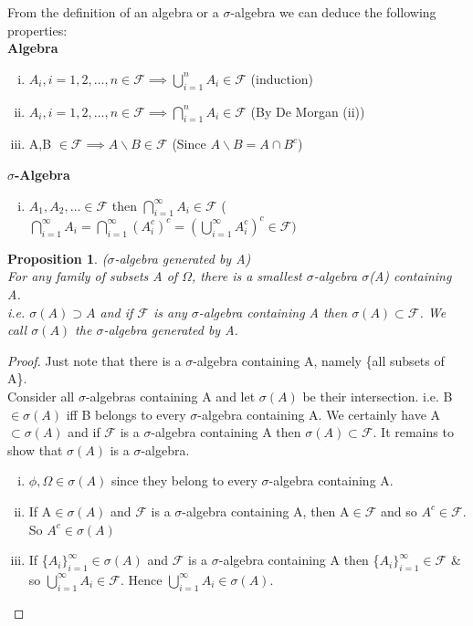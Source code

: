 \documentclass[12pt]{article}
\newtheorem{prop}{Proposition}
\begin{document}
From the definition of an algebra or a $\sigma$-algebra we can deduce the following properties:
\vspace{20pt}\\
{\bf Algebra}
\begin{enumerate}[(i)]
  \item $A_{i}, i=1,2,\dots,n \in \mathcal{F} \implies \bigcup_{i=1}^{n} A_{i} \in \mathcal{F}$ (induction)
  \item  $A_{i}, i=1,2,\dots,n \in \mathcal{F} \implies \bigcap_{i=1}^{n} A_{i} \in \mathcal{F}$ (By De Morgan (ii))
  \item A,B $\in \mathcal{F} \implies A\backslash B\in \mathcal{F}$ (Since $A\backslash B=A\cap B^{c}$)
\end{enumerate}

\vspace{12pt}
{\bf $\sigma$-Algebra}
\begin{enumerate}[(i)]
  \item  $A_{1}, A_{2},\dots \in \mathcal{F}$ then $\bigcap_{i=1}^{\infty} A_{i} \in \mathcal{F}$  ($\bigcap_{i=1}^{\infty} A_{i} = \bigcap_{i=1}^{\infty}( A_{i}^{c})^{c}= (\bigcup_{i=1}^{\infty} A_{i}^{c})^{c}\in \mathcal{F})$
\end{enumerate}
\vspace{12pt}
\begin{prop}($\sigma$-algebra generated by A)\\ For any family of subsets A of $\Omega$, there is a smallest $\sigma$-algebra $\sigma$(A) containing A.\\ i.e. $\sigma(A) \supset A$ and if $\mathcal{F}$ is any $\sigma$-algebra containing A then 
$\sigma(A)\subset\mathcal{F}$. We call $\sigma(A)$ the $\sigma$-algebra generated by A.
\end{prop}

\begin{proof}
Just note that there is a $\sigma$-algebra containing A, namely \{all subsets of A\}.\\ Consider all $\sigma$-algebras containing A and let $\sigma(A)$ be their intersection. i.e. B$\in\sigma(A)$ iff B belongs to every $\sigma$-algebra containing A. We certainly have A$\subset\sigma(A)$ and if $\mathcal{F}$ is a $\sigma$-algebra containing A then $\sigma(A)\subset\mathcal{F}$. It remains to show that $\sigma(A)$ is a $\sigma$-algebra.
\begin{enumerate}[(i)]
  \item $\phi, \Omega \in \sigma(A)$ since they belong to every $\sigma$-algebra containing A.
  \item  If A$\in \sigma(A)$ and $\mathcal{F}$ is a $\sigma$-algebra containing A, then A$\in \mathcal{F}$ and so $A^{c}\in\mathcal{F}$.\\ So $A^{c}\in\sigma(A)$
  \item If \{$A_{i}\}_{i=1}^{\infty}\in\sigma(A)$ and $\mathcal{F}$ is a $\sigma$-algebra containing A then  \{$A_{i}\}_{i=1}^{\infty}\in\mathcal{F}$ \& so $\bigcup_{i=1}^{\infty} A_{i}\in\mathcal{F}$. Hence $\bigcup_{i=1}^{\infty} A_{i}\in\sigma(A)$.
\end{enumerate}
\end{proof}
\end{document}
